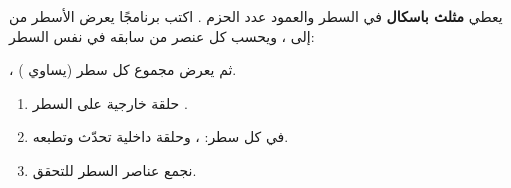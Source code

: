 \begin{statement}
يعطي \textbf{مثلث باسكال} في السطر  والعمود  عدد الحزم . اكتب برنامجًا يعرض الأسطر من  إلى ، ويحسب كل عنصر من سابقه في نفس السطر: \par{\centering\small{}\par}، ثم يعرض مجموع كل سطر (يساوي ).
\end{statement}
\begin{stepsbox}\begin{enumerate}
\item حلقة خارجية على السطر .
\item في كل سطر: ، وحلقة داخلية تحدّث  وتطبعه.
\item نجمع عناصر السطر للتحقق.
\end{enumerate}\end{stepsbox}

